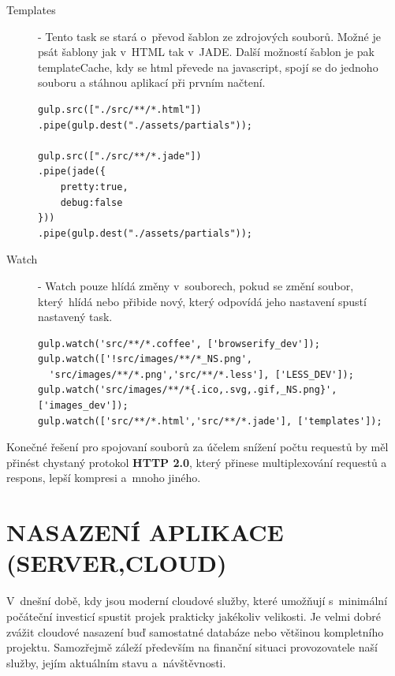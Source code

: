 \documentclass[a4paper,12pt,twoside,BCOR=10mm]{article}
\newcommand{\upc}[1]{\uppercase{#1}} %
\renewcommand{\b}[1]{\textbf{#1}} %
\newenvironment{codeframe}{%
  \begin{Sbox} 
    \begin{minipage} 
      {\columnwidth-\leftmargin-\rightmargin-2\fboxsep-2\fboxrule-4pt} 
}{%

  \end{minipage} 
  \end{Sbox} 
  \begin{center} 
    \fcolorbox{black}{codeback}{\TheSbox} 
  \end{center} 
}
\begin{document}
\begin{description}
\item[Templates] - Tento task se stará o~převod šablon ze zdrojových souborů. Možné je psát šablony jak v~HTML tak v~JADE. Další možností šablon je pak templateCache, kdy se html převede na javascript, spojí se do jednoho souboru a stáhnou aplikací při prvním načtení.
\begin{codeframe}
  \begin{verbatim}
gulp.src(["./src/**/*.html"])
.pipe(gulp.dest("./assets/partials"));

gulp.src(["./src/**/*.jade"])
.pipe(jade({
    pretty:true,
    debug:false
}))
.pipe(gulp.dest("./assets/partials"));
  \end{verbatim}
\end{codeframe}

\item[Watch] - Watch pouze hlídá změny v~souborech, pokud se změní soubor, který~hlídá nebo přibide nový, který odpovídá jeho nastavení spustí nastavený task.
\begin{codeframe}
  \begin{verbatim}
gulp.watch('src/**/*.coffee', ['browserify_dev']);
gulp.watch(['!src/images/**/*_NS.png',
  'src/images/**/*.png','src/**/*.less'], ['LESS_DEV']);
gulp.watch('src/images/**/*{.ico,.svg,.gif,_NS.png}', ['images_dev']);
gulp.watch(['src/**/*.html','src/**/*.jade'], ['templates']);
  \end{verbatim}
\end{codeframe}
\end{description}

Konečné řešení pro spojovaní souborů za účelem snížení počtu requestů by měl přinést chystaný protokol \b{HTTP 2.0}, který přinese multiplexování requestů a respons, lepší kompresi a~mnoho jiného.\cite{http2}

\section{\upc{Nasazení aplikace (server,cloud)}}
V~dnešní době, kdy jsou moderní cloudové služby, které umožňují s~minimální počáteční investicí spustit projek prakticky jakékoliv velikosti. Je velmi dobré zvážit cloudové nasazení buď samostatné databáze nebo většinou kompletního projektu. Samozřejmě záleží především na finanční situaci provozovatele naší služby, jejím aktuálním stavu a~návštěvnosti.\\
\end{document}
